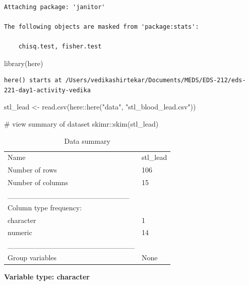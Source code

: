 \documentclass[
  letterpaper,
  DIV=11,
  numbers=noendperiod]{scrartcl}
\newenvironment{Shaded}{\begin{snugshade}}{\end{snugshade}}
\newcommand{\CommentTok}[1]{\textcolor[rgb]{0.37,0.37,0.37}{#1}}
\newcommand{\FunctionTok}[1]{\textcolor[rgb]{0.28,0.35,0.67}{#1}}
\newcommand{\NormalTok}[1]{\textcolor[rgb]{0.00,0.23,0.31}{#1}}
\newcommand{\OtherTok}[1]{\textcolor[rgb]{0.00,0.23,0.31}{#1}}
\newcommand{\SpecialCharTok}[1]{\textcolor[rgb]{0.37,0.37,0.37}{#1}}
\newcommand{\StringTok}[1]{\textcolor[rgb]{0.13,0.47,0.30}{#1}}
\begin{document}
\begin{verbatim}

Attaching package: 'janitor'

The following objects are masked from 'package:stats':

    chisq.test, fisher.test
\end{verbatim}

\begin{Shaded}
\begin{Highlighting}[]
\FunctionTok{library}\NormalTok{(here)}
\end{Highlighting}
\end{Shaded}

\begin{verbatim}
here() starts at /Users/vedikashirtekar/Documents/MEDS/EDS-212/eds-221-day1-activity-vedika
\end{verbatim}

\begin{Shaded}
\begin{Highlighting}[]
\NormalTok{stl\_lead }\OtherTok{\textless{}{-}} \FunctionTok{read.csv}\NormalTok{(here}\SpecialCharTok{::}\FunctionTok{here}\NormalTok{(}\StringTok{"data"}\NormalTok{, }\StringTok{"stl\_blood\_lead.csv"}\NormalTok{))}

\CommentTok{\# view summary of dataset}
\NormalTok{skimr}\SpecialCharTok{::}\FunctionTok{skim}\NormalTok{(stl\_lead)}
\end{Highlighting}
\end{Shaded}

\begin{longtable}[]{@{}ll@{}}
\caption{Data summary}\tabularnewline
\toprule\noalign{}
\endfirsthead
\endhead
\bottomrule\noalign{}
\endlastfoot
Name & stl\_lead \\
Number of rows & 106 \\
Number of columns & 15 \\
\_\_\_\_\_\_\_\_\_\_\_\_\_\_\_\_\_\_\_\_\_\_\_ & \\
Column type frequency: & \\
character & 1 \\
numeric & 14 \\
\_\_\_\_\_\_\_\_\_\_\_\_\_\_\_\_\_\_\_\_\_\_\_\_ & \\
Group variables & None \\
\end{longtable}

\textbf{Variable type: character}
\end{document}
